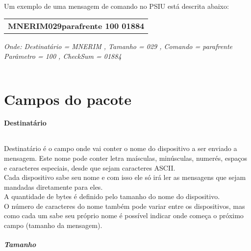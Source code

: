 \documentclass[11pt,a4paper]{article}
\begin{document}
\paragraph*{}Um exemplo de uma mensagem de comando no PSIU está descrita abaixo:\\

\begin{table}[ht]
	\centering
	
	\begin{tabular}{l}
		
		 \textbf{MNERIM029parafrente 100 01884}\\
		
	\end{tabular}
	\label{tab:formatoslatex} %
\end{table}

\textsl
{Onde: 
Destinatário = MNERIM , 
Tamanho = 029 ,
Comando = parafrente
Parâmetro = 100 ,
CheckSum = 01884} \\ \\

\newpage
\part*{Campos do pacote} 

\textbf{Destinatário}
\paragraph{}Destinatário é o campo onde vai conter o nome do dispositivo a ser enviado a mensagem.
Este nome pode conter letra maísculas, minúsculas, numerés, espaços e caracteres especiais, desde que sejam caracteres ASCII. \\
Cada dispositivo sabe seu nome e com isso ele só irá ler as mensagens que sejam mandadas diretamente para eles. \\
A quantidade de bytes é definido pelo tamanho do nome do dispositivo. \\ 
O número de caracteres do nome também pode variar entre os dispositivos, mas como cada um sabe seu próprio nome é possível indicar onde começa o próximo campo (tamanho da mensagem).



\paragraph{\textbf{Tamanho} \newline \newline} 
\end{document}
